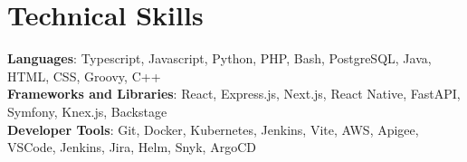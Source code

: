\documentclass[letterpaper,11pt]{article}
\newcommand{\resumeItem}[1]{
  \item\small{
    {#1 \vspace{-2pt}}
  }
}
\newcommand{\resumeItemListStart}{\begin{itemize}}
\newcommand{\resumeItemListEnd}{\end{itemize}\vspace{-10pt}}
\begin{document}

%
\section{Technical Skills}
 \begin{itemize}[leftmargin=0.15in, label={}]
    \small{\item{
     \textbf{Languages}{: Typescript, Javascript, Python, PHP, Bash, PostgreSQL, Java, HTML, CSS, Groovy, C++} \\
     \textbf{Frameworks and Libraries}{: React, Express.js, Next.js, React Native, FastAPI, Symfony, Knex.js, Backstage} \\
     \textbf{Developer Tools}{: Git, Docker, Kubernetes, Jenkins, Vite, AWS, Apigee, VSCode, Jenkins, Jira, Helm, Snyk, ArgoCD} \\
    }}
 \end{itemize}


\end{document}
